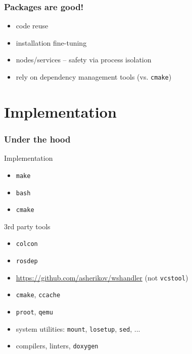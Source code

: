 \documentclass[hyperref={colorlinks=false, breaklinks=true},11pt]{beamer}
\begin{document}
\begin{frame}
    \frametitle{Packages are good!}
    \begin{block}{}
        \begin{itemize}
            \item code reuse
            \item installation fine-tuning
            \item nodes/services -- safety via process isolation
            \item rely on dependency management tools (vs. \texttt{cmake})
        \end{itemize}
    \end{block}

\end{frame}


\section{Implementation}

\begin{frame}
    \frametitle{Under the hood}

    \begin{block}{Implementation}
        \begin{itemize}
            \item[] \texttt{make}
            \item[] \texttt{bash}
            \item[] \texttt{cmake}
        \end{itemize}
    \end{block}

    \begin{block}{3rd party tools}
        \begin{itemize}
            \item[] \texttt{colcon}
            \item[] \texttt{rosdep}
            \item[] \url{https://github.com/asherikov/wshandler} (not \texttt{vcstool})
            \item[] \texttt{cmake}, \texttt{ccache}
            \item[] \texttt{proot}, \texttt{qemu}
            \item[] system utilities: \texttt{mount}, \texttt{losetup}, \texttt{sed}, ...
            \item[] compilers, linters, \texttt{doxygen}
        \end{itemize}
    \end{block}
\end{frame}
\end{document}
